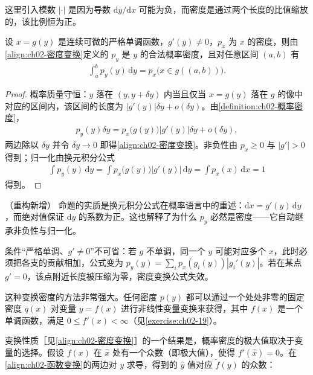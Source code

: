 \documentclass[../../main.tex]{subfiles}
\begin{document}
这里引入模数 $|\cdot|$ 是因为导数 $\mathrm{d}y/\mathrm{d}x$ 可能为负，而密度是通过两个长度的比值缩放的，该比例恒为正。

\begin{proposition}[一元密度变换公式]\label{proposition:ch02-一元密度变换}
设 $x=g(y)$ 是连续可微的严格单调函数，$g'(y)\neq0$，$p_x$ 为 $x$ 的密度，则由\eqref{align:ch02-密度变换}定义的 $p_y$ 是 $y$ 的合法概率密度，且对任意区间 $(a,b)$ 有
\begin{align*}
  \int_{a}^{b} p_y(y)\,\mathrm{d}y = p_x\big(x\in g((a,b))\big) .
\end{align*}
\end{proposition}

\begin{proof}
概率质量守恒：$y$ 落在 $(y,y+\delta y)$ 内当且仅当 $x=g(y)$ 落在 $g$ 的像中对应的区间内，该区间的长度为 $|g'(y)|\delta y+o(\delta y)$。由\cref{definition:ch02-概率密度}，
\begin{align*}
  p_y(y)\delta y = p_x\big(g(y)\big)\big|g'(y)\big|\delta y + o(\delta y) ,
\end{align*}
两边除以 $\delta y$ 并令 $\delta y\to0$ 即得\eqref{align:ch02-密度变换}。非负性由 $p_x\geqslant0$ 与 $|g'|>0$ 得到；归一化由换元积分公式
\begin{align*}
  \int p_y(y)\,\mathrm{d}y = \int p_x\big(g(y)\big)\big|g'(y)\big|\,\mathrm{d}y = \int p_x(x)\,\mathrm{d}x = 1
\end{align*}
得到。
\end{proof}

\begin{remark}（重构新增）
命题的实质是换元积分公式在概率语言中的重述：$\mathrm{d}x = g'(y)\,\mathrm{d}y$，而绝对值保证 $\mathrm{d}y$ 的系数为正。这也解释了为什么 $p_y$ 必然是密度——它自动继承非负性与归一化。

条件“严格单调、$g'\neq0$”不可省：若 $g$ 不单调，同一个 $y$ 可能对应多个 $x$，此时必须把各支的贡献相加，公式变为 $p_y(y)=\sum_i p_x(g_i(y))|g_i'(y)|$。若在某点 $g'=0$，该点附近长度被压缩为零，密度变换公式失效。
\end{remark}

这种变换密度的方法非常强大。任何密度 $p(y)$ 都可以通过一个处处非零的固定密度 $q(x)$ 对变量 $y=f(x)$ 进行非线性变量变换来获得，其中 $f(x)$ 是一个单调函数，满足 $0\leqslant f'(x)<\infty$（见\cref{exercise:ch02-19}）。

变换性质［见\eqref{align:ch02-密度变换}］的一个结果是，概率密度的极大值取决于变量的选择。假设 $f(x)$ 在 $\hat{x}$ 处有一个众数（即极大值），使得 $f'(\hat{x})=0$。在\eqref{align:ch02-函数变换}的两边对 $y$ 求导，得到的 $\hat{y}$ 值对应 $\tilde{f}(y)$ 的众数：
\end{document}

